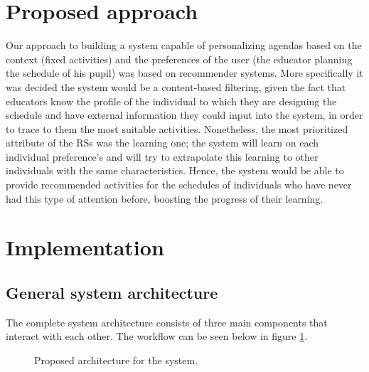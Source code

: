 \documentclass[10pt,twocolumn,letterpaper]{article}
\begin{document}
\section{Proposed approach}
Our approach to building a system capable of personalizing agendas based on the context (fixed activities) and the preferences of the user (the educator planning the schedule of his pupil) was based on recommender systems. More specifically it was decided the system would be a content-based filtering, given the fact that educators know the profile of the individual to which they are designing the schedule and have external information they could input into the system, in order to trace to them the most suitable activities. Nonetheless, the most prioritized attribute of the RSs was the learning one; the system will learn on each individual preference's and will try to extrapolate this learning to other individuals with the same characteristics. Hence, the system would be able to provide recommended activities for the schedules of individuals who have never had this type of attention before, boosting the progress of their learning.


\section{Implementation}
\subsection{General system architecture}

The complete system architecture consists of three main components that interact with each other. The workflow can be seen below in figure \ref{fig:architecture}. 

\begin{figure}
       \centering
       \caption{Proposed architecture for the system.}
       \label{fig:architecture}
\end{figure}
\end{document}
